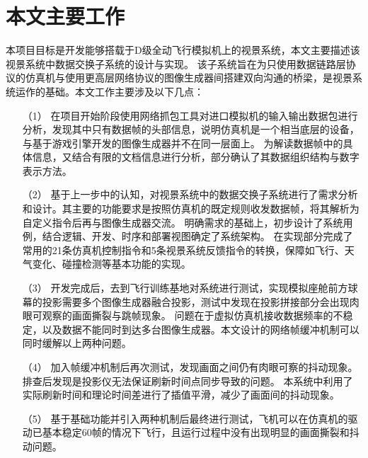 \section{本文主要工作}
本项目目标是开发能够搭载于D级全动飞行模拟机上的视景系统，本文主要描述该视景系统中数据交换子系统的设计与实现。
该子系统旨在为只使用数据链路层协议的仿真机与使用更高层网络协议的图像生成器间搭建双向沟通的桥梁，是视景系统运作的基础。本文工作主要涉及以下几点：
\begin{itemize}
    \item [（1）]
    在项目开始阶段使用网络抓包工具对进口模拟机的输入输出数据包进行分析，发现其中只有数据帧的头部信息，说明仿真机是一个相当底层的设备，与基于游戏引擎开发的图像生成器并不在同一层面上。
    为解读数据帧中的具体信息，又结合有限的文档信息进行分析，部分确认了其数据组织结构与数字表示方法。
    \item [（2）]
    基于上一步中的认知，对视景系统中的数据交换子系统进行了需求分析和设计。其主要的功能要求是按照仿真机的既定规则收发数据帧，将其解析为自定义指令后再与图像生成器交流。
    明确需求的基础上，初步设计了系统用例，结合逻辑、开发、时序和部署视图确定了系统架构。
    在实现部分完成了常用的21条仿真机控制指令和5条视景系统反馈指令的转换，保障如飞行、天气变化、碰撞检测等基本功能的实现。
    \item [（3）]
    开发完成后，去到飞行训练基地对系统进行测试，实现模拟座舱前方球幕的投影需要多个图像生成器融合投影，测试中发现在投影拼接部分会出现肉眼可观察的画面撕裂与跳帧现象。
    问题在于虚拟仿真机接收数据频率的不稳定，以及数据不能同时到达多台图像生成器。本文设计的网络帧缓冲机制可以同时缓解以上两种问题。
    \item [（4）]
    加入帧缓冲机制后再次测试，发现画面之间仍有肉眼可察的抖动现象。排查后发现是投影仪无法保证刷新时间点同步导致的问题。
    本系统中利用了实际刷新时间和理论时间差进行了插值平滑，减少了画面间的抖动现象。
    \item [（5）]
    基于基础功能并引入两种机制后最终进行测试，飞机可以在仿真机的驱动已基本稳定60帧的情况下飞行，且运行过程中没有出现明显的画面撕裂和抖动问题。

\end{itemize}
